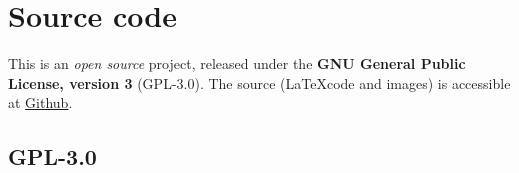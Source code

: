 
\section{Source code}
This is an \emph{open source} project, released under the \textbf{GNU General Public License, version 3} (GPL-3.0). The source (\LaTeX code and images) is accessible at \href{https://github.com/Ernir/VancianToPsionics}{Github}.
\subsection{GPL-3.0}
